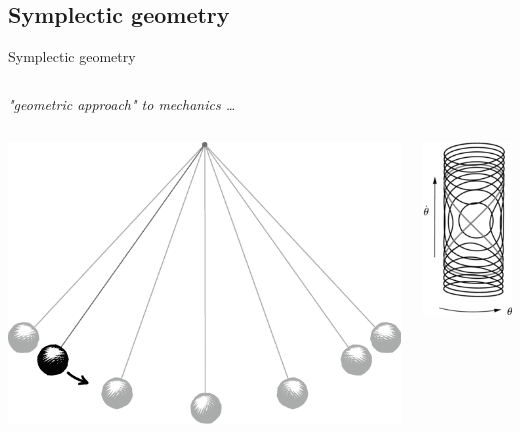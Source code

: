 \documentclass[handout,10pt]{beamer}
\begin{document}
\subsection{Symplectic geometry}
\begin{frame}{Symplectic geometry}
\begin{columns}[T]
	\begin{column}{.50\linewidth}
		\centering
		\textit{ "geometric approach" to mechanics \dots}
		\begin{columns}
			\begin{column}{.50\linewidth}
				\begin{center}
					\includegraphics[width=0.8\linewidth]{Pictures/pendulum13}			
				\end{center}
			\end{column}	
			\begin{column}{.50\linewidth}
				\begin{center}
					\includegraphics[width=0.45\linewidth]{Pictures/pendulum-phase-space}			

\end{center}
\end{column}
\end{columns}
\end{column}
\end{columns}
\end{frame}
\end{document}
